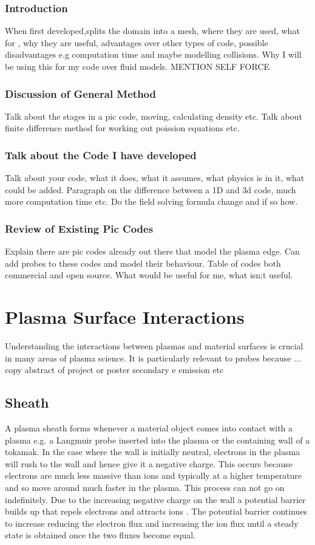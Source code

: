 \documentclass[12pt]{article}
\begin{document}
\subsubsection{Introduction}
When first developed,splits the domain into a mesh, where they are used, what for , why they are useful, advantages over other types of code, possible disadvantages e.g computation time and maybe modelling collisions. 
Why I will be using this for my code over fluid models. 
MENTION SELF FORCE
\subsubsection{Discussion of General Method} 
Talk about the stages in a pic code, moving, calculating density etc. Talk about finite difference method for working out poission equations etc. 

\subsubsection{Talk about the Code I have developed}
Talk about your code, what it does, what it assumes, what physics is in it, what could be added. 
Paragraph on the difference between a 1D and 3d code, much more computation time etc. Do the field solving formula change and if so how.
\subsubsection{Review of Existing Pic Codes}
Explain there are pic codes already out there that model the plasma edge. Can add probes to these codes and model their behaviour. 
Table of codes both commercial and open source. What would be useful for me, what isn;t useful. 

\section{Plasma Surface Interactions}
Understanding the interactions between plasmas and material surfaces is crucial in many areas of plasma science. It is particularly relevant to probes because ... copy abstract of project or poster secondary e emission etc
\subsection{Sheath}
A plasma sheath forms whenever a material object comes into contact with a plasma e.g. a Langmuir probe inserted into the plasma or the containing wall of a tokamak. In the case where the wall is initially neutral, electrons in the plasma will rush to the wall and hence give it a negative charge. This occurs because electrons are much less massive than ions and typically at a higher temperature and so move around much faster in the plasma. This process can not go on indefinitely. Due to the increasing negative charge on the wall a potential barrier builds up that repels electrons and attracts ions \cite{sheathformation}. The potential barrier continues to increase reducing the electron flux and increasing the ion flux until a steady state is obtained once the two fluxes become equal. 
\end{document}

